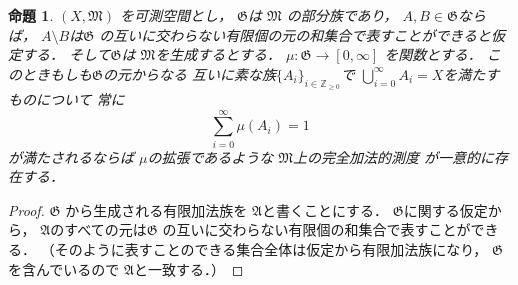 \documentclass[leqno, a4paper, 12pt]{jsarticle}
\newtheorem{prop}[thm]{命題}
\newcommand{\zz}{\mathbb{Z}}
\begin{document}
\begin{prop}\label{prop:hodai}
$(X, \mathfrak{M})$
を可測空間とし，
$\mathfrak{G}$は
$\mathfrak{M}$
の部分族であり，
$A, B\in \mathfrak{G}$ならば，
$A\setminus B$は$\mathfrak{G}$
の互いに交わらない有限個の元の和集合で表すことができると仮定する．
そして$\mathfrak{G}$は
$\mathfrak{M}$を生成するとする．
$\mu: \mathfrak{G}\to [0, \infty]$
を関数とする．
このときもしも$\mathfrak{G}$の元からなる
互いに素な族$\{A_{i}\}_{i\in \zz_{\ge 0}}$で
$\bigcup_{i=0}^{\infty}A_{i}=X$を満たすものについて
常に
\begin{equation}
\tag{A}
\sum_{i=0}^{\infty}\mu(A_{i})=1
\end{equation}
が満たされるならば
$\mu$の拡張であるような
$\mathfrak{M}$上の完全加法的測度
が一意的に存在する．
\end{prop}
\begin{proof}
$\mathfrak{G}$
から生成される有限加法族を
$\mathfrak{A}$と書くことにする．
$\mathfrak{G}$に関する仮定から，
$\mathfrak{A}$のすべての元は$\mathfrak{G}$
の互いに交わらない有限個の和集合で表すことができる．
（そのように表すことのできる集合全体は仮定から有限加法族になり，
$\mathfrak{G}$を含んでいるので
$\mathfrak{A}$と一致する．）


\end{proof}
\end{document}
